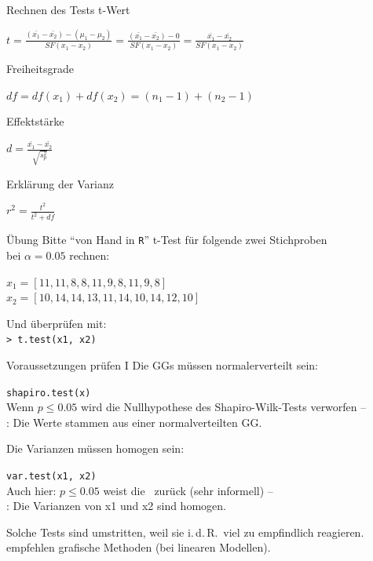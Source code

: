 \begin{frame}
  {Rechnen des Tests}
  t-Wert
  \begin{center}
    \alert{$t=$}$\frac{(\bar{x_1}-\bar{x_2})-(\mu_1-\mu_2)}{SF(x_1-x_2)}=\frac{(\bar{x_1}-\bar{x_2})-0}{SF(x_1-x_2)}=$\alert{$\frac{\bar{x_1}-\bar{x_2}}{SF(x_1-x_2)}$}
  \end{center}
  \pause
  Freiheitsgrade
  \begin{center}
    $df=df(x_1)+df(x_2)=(n_1-1)+(n_2-1)$
  \end{center}
  \pause
  Effektstärke
  \begin{center}
    $d=\frac{\bar{x_1}-\bar{x_2}}{\sqrt{s^2_p}}$
  \end{center}
  \pause
  Erklärung der Varianz
  \begin{center}
    $r^2=\frac{t^2}{t^2+df}$
  \end{center}
\end{frame}

\begin{frame}
  {Übung}
  Bitte "`von Hand in \texttt{R}"' t-Test für folgende zwei Stichproben\\
  bei $\alpha=0.05$ rechnen:\\
  \begin{center}
    $x_1=[11, 11, 8, 8, 11, 9, 8, 11, 9, 8]$\\
    $x_2=[10, 14, 14, 13, 11, 14, 10, 14, 12, 10]$
  \end{center}
  \pause
  \begin{center}
    Und überprüfen mit:\\
    \texttt{> t.test(x1, x2)}
  \end{center}
\end{frame}

\begin{frame}
  {Voraussetzungen prüfen I}
  Die \alert{GGs müssen normalerverteilt} sein:
  \begin{center}
    \texttt{shapiro.test(x)}\\
    Wenn $p\leq0.05$ wird die Nullhypothese des Shapiro-Wilk-Tests verworfen --\\
    \Null: Die Werte stammen aus einer normalverteilten GG.
  \end{center}
  \pause
  Die \alert{Varianzen müssen homogen sein}:
  \begin{center}
    \texttt{var.test(x1, x2)}\\
    Auch hier: $p\leq0.05$ weist die \Null\ zurück (sehr informell) --\\
    \Null: Die Varianzen von x1 und x2 sind homogen.
  \end{center}
\pause
\begin{center}
  \alert{Solche Tests sind umstritten, weil sie i.\,d.\,R.\ viel zu empfindlich reagieren.\\
    \citet{ZuurEa2009} empfehlen \zB grafische Methoden (bei linearen Modellen).}
\end{center}

\end{frame}


